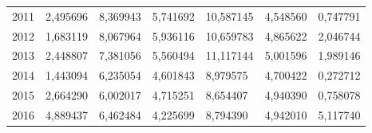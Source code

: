 \begin{table}
\begin{tabular}{p{1cm}p{2cm}p{2cm}p{2cm}p{2cm}p{2cm}p{2cm}}
 2011 &                                     2,495696 &  8,369943 &          5,741692 &   10,587145 &                          4,548560 &                 0,747791 \\
 2012 &                                     1,683119 &  8,067964 &          5,936116 &   10,659783 &                          4,865622 &                 2,046744 \\
 2013 &                                     2,448807 &  7,381056 &          5,560494 &   11,117144 &                          5,001596 &                 1,989146 \\
 2014 &                                     1,443094 &  6,235054 &          4,601843 &    8,979575 &                          4,700422 &                 0,272712 \\
 2015 &                                     2,664290 &  6,002017 &          4,715251 &    8,654407 &                          4,940390 &                 0,758078 \\
 2016 &                                     4,889437 &  6,462484 &          4,225699 &    8,794390 &                          4,942010 &                 5,117740 \\
\bottomrule
\end{tabular}
\end{table}
